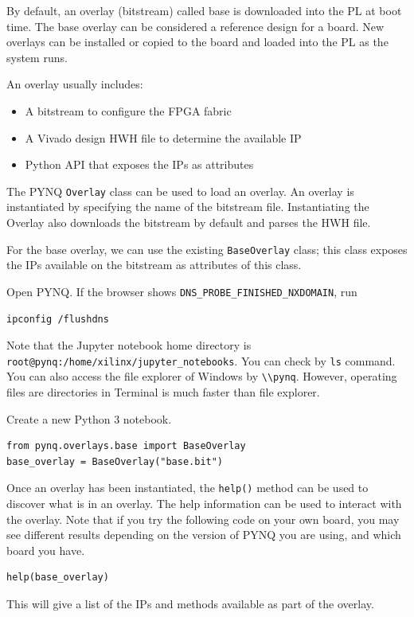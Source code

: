 \documentclass[a4paper,12pt,twoside]{article}
\begin{document}
By default, an overlay (bitstream) called base is downloaded into the PL at boot time. The base overlay can be considered a reference design for a board. New overlays can be installed or copied to the board and loaded into the PL as the system runs.

An overlay usually includes:
\begin{itemize}
    \item A bitstream to configure the FPGA fabric
    \item A Vivado design HWH file to determine the available IP
    \item Python API that exposes the IPs as attributes
\end{itemize}
The PYNQ \texttt{Overlay} class can be used to load an overlay. An overlay is instantiated by specifying the name of the bitstream file. Instantiating the Overlay also downloads the bitstream by default and parses the HWH file.

For the base overlay, we can use the existing \texttt{BaseOverlay} class; this class exposes the IPs available on the bitstream as attributes of this class.

Open PYNQ. If the browser shows \verb|DNS_PROBE_FINISHED_NXDOMAIN|, run
\begin{verbatim}
ipconfig /flushdns
\end{verbatim}
Note that the Jupyter notebook home directory is \verb|root@pynq:/home/xilinx/jupyter_notebooks|. You can check by \texttt{ls} command. You can also access the file explorer of Windows by \verb|\\pynq|. However, operating files are directories in Terminal is much faster than file explorer.

Create a new Python 3 notebook.
\begin{verbatim}
from pynq.overlays.base import BaseOverlay
base_overlay = BaseOverlay("base.bit")
\end{verbatim}
Once an overlay has been instantiated, the \texttt{help()} method can be used to discover what is in an overlay. The help information can be used to interact with the overlay. Note that if you try the following code on your own board, you may see different results depending on the version of PYNQ you are using, and which board you have.
\begin{verbatim}
help(base_overlay)
\end{verbatim}
This will give a list of the IPs and methods available as part of the overlay.
\end{document}
